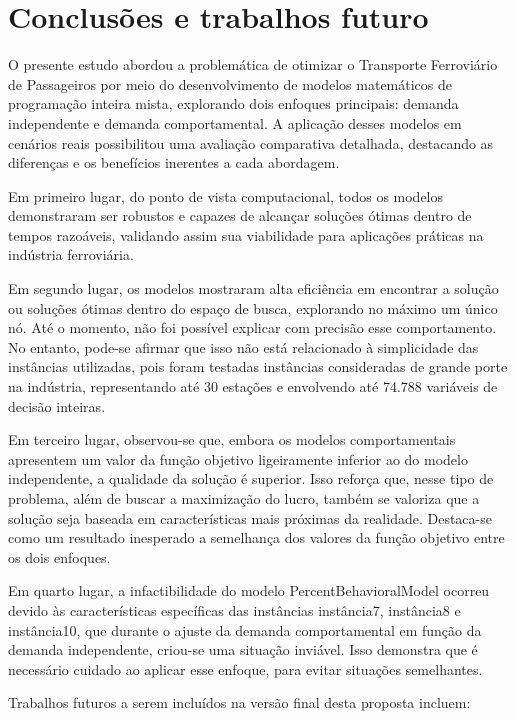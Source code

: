 \chapter{Conclusões e trabalhos futuro}

O presente estudo abordou a problemática de otimizar o Transporte Ferroviário de Passageiros por meio do desenvolvimento de modelos matemáticos de programação inteira mista, explorando dois enfoques principais: demanda independente e demanda comportamental. A aplicação desses modelos em cenários reais possibilitou uma avaliação comparativa detalhada, destacando as diferenças e os benefícios inerentes a cada abordagem.

Em primeiro lugar, do ponto de vista computacional, todos os modelos demonstraram ser robustos e capazes de alcançar soluções ótimas dentro de tempos razoáveis, validando assim sua viabilidade para aplicações práticas na indústria ferroviária.

Em segundo lugar, os modelos mostraram alta eficiência em encontrar a solução ou soluções ótimas dentro do espaço de busca, explorando no máximo um único nó. Até o momento, não foi possível explicar com precisão esse comportamento. No entanto, pode-se afirmar que isso não está relacionado à simplicidade das instâncias utilizadas, pois foram testadas instâncias consideradas de grande porte na indústria, representando até 30 estações e envolvendo até 74.788 variáveis de decisão inteiras.

Em terceiro lugar, observou-se que, embora os modelos comportamentais apresentem um valor da função objetivo ligeiramente inferior ao do modelo independente, a qualidade da solução é superior. Isso reforça que, nesse tipo de problema, além de buscar a maximização do lucro, também se valoriza que a solução seja baseada em características mais próximas da realidade. Destaca-se como um resultado inesperado a semelhança dos valores da função objetivo entre os dois enfoques.

Em quarto lugar, a infactibilidade do modelo PercentBehavioralModel ocorreu devido às características específicas das instâncias instância7, instância8 e instância10, que durante o ajuste da demanda comportamental em função da demanda independente, criou-se uma situação inviável. Isso demonstra que é necessário cuidado ao aplicar esse enfoque, para evitar situações semelhantes.

Trabalhos futuros a serem incluídos na versão final desta proposta incluem:

